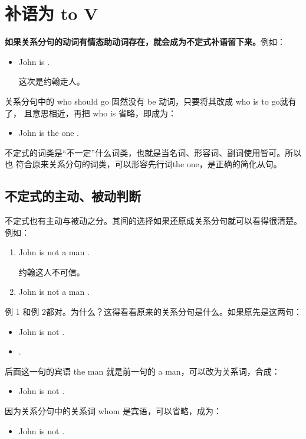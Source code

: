 \section{补语为 to V}

\textbf{如果关系分句的动词有情态助动词存在，就会成为不定式补语留下来。}例如：
\begin{itemize}
\item John is  .

  这次是约翰走人。
\end{itemize}
关系分句中的 who should go 固然没有 be 动词，只要将其改成 who is to go就有了，
且意思相近，再把 who is 省略，即成为：
\begin{itemize}
\item   John is the one .
\end{itemize}

不定式的词类是“不一定”什么词类，也就是当名词、形容词、副词使用皆可。所以也
符合原来关系分句的词类，可以形容先行词the one，是正确的简化从句。

\subsection{不定式的主动、被动判断}

不定式也有主动与被动之分。其间的选择如果还原成关系分句就可以看得很清楚。例如：
\begin{enumerate}
\item John is not a man .

  约翰这人不可信。
\item John is not a man  .
\end{enumerate}
例 1 和例 2都对。为什么？这得看看原来的关系分句是什么。如果原先是这两句：
\begin{itemize}
\item John is not .
\item {}  .
\end{itemize}
后面这一句的宾语 the man 就是前一句的 a man，可以改为关系词，合成：
\begin{itemize}
\item John is not  .
\end{itemize}

因为关系分句中的关系词 whom 是宾语，可以省略，成为：
\begin{itemize}
\item John is not  .
\end{itemize}

